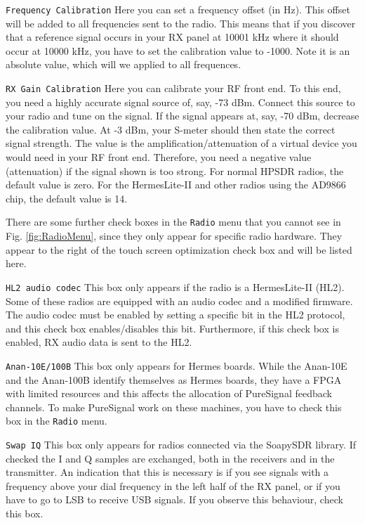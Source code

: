\documentclass[12pt]{book}
\def\rett#1{\texttt{\color{red}#1}}
\def\bltt#1{\texttt{\color{blue}#1}}
\begin{document}
\rett{Frequency Calibration} Here you can set a frequency offset (in Hz). This offset
will be added to all frequencies sent to the radio. This means that if you discover that
a reference signal occurs in your RX panel at 10001 kHz where it should occur at 10000
kHz, you have to set the calibration value to -1000. Note it is an absolute value,
which will we applied to all frequences.

\rett{RX Gain Calibration} Here you can calibrate your RF front end. To this end, you
need a highly accurate signal source of, say, -73 dBm. Connect this source to your
radio and tune on the signal. If the signal appears at, say, -70 dBm, decrease the
calibration value. At -3 dBm, your S-meter should then state the correct signal
strength. The value is the  amplification/attenuation of  a virtual device you
would need in your RF front end. Therefore, you need a negative value (attenuation)
if the signal shown is too strong. For normal HPSDR radios, the default value is
 zero. For the HermesLite-II and other radios using the AD9866 chip, the default
 value is 14.
 
 There are some further check boxes in the \bltt{Radio} menu that you cannot see
 in Fig. \ref{fig:RadioMenu}, since they only appear for specific radio hardware.
 They appear to the right of the touch screen optimization check box
 and will be listed here.
 
 \rett{HL2 audio codec} This box only appears if the radio is a HermesLite-II (HL2). Some
 of these radios are equipped with an audio codec and a modified firmware. The
 audio codec must be enabled by setting a specific bit in the HL2 protocol,
 and this check box enables/disables this bit. Furthermore, if this check box
 is enabled, RX audio data is sent to the HL2.
 
 \rett{Anan-10E/100B} This box only appears for Hermes boards. While the Anan-10E and
 the Anan-100B identify themselves as Hermes boards, they have a FPGA with limited
 resources and this affects the allocation of PureSignal feedback channels. To make
 PureSignal work on these machines, you have to check this box in the \bltt{Radio} menu.
 
 \rett{Swap IQ} This box only appears for radios connected via the SoapySDR library. If checked
 the I and Q samples are exchanged, both in the receivers and in the transmitter. An indication
 that this is necessary is if you see signals with a frequency above your dial frequency in
 the left half of the RX panel, or if you have to go to LSB to receive USB signals. If you
 observe this behaviour, check this box.
 
\end{document}
